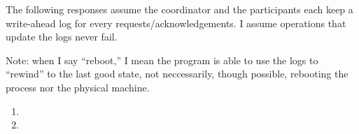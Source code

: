 The following responses assume the coordinator and the participants each keep a write-ahead log for every requests/acknowledgements.
I assume operations that update the logs never fail.

Note: when I say ``reboot,'' I mean the program is able to use the logs to ``rewind'' to the last good state, not neccessarily, though possible, rebooting the process nor the physical machine.
\begin{enumerate}[1]
\item
\item
\end{enumerate}
